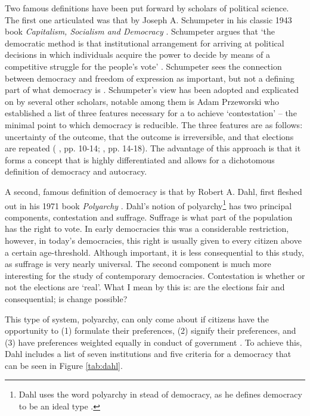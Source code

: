 Two famous definitions have been put forward by scholars of political science. The first one articulated was that by Joseph A. Schumpeter in his classic 1943 book \textit{Capitalism, Socialism and Democracy} \citeyearpar{schumpeter_capitalism_2010}.  Schumpeter argues that `the democratic method is that institutional arrangement for arriving at political decisions in which individuals acquire the power to decide by means of a competitive struggle for the people’s vote' \citep[p. 241]{schumpeter_capitalism_2010}. Schumpeter sees the connection between democracy and freedom of expression as important, but not a defining part of what democracy is \citep[pp. 243-244]{schumpeter_capitalism_2010}. Schumpeter's view has been adopted and explicated on by several other scholars, notable among them is Adam Przeworski who established a list of three features necessary for a to achieve `contestation' -- the minimal point to which democracy is reducible. The three features are as follows: uncertainty of the outcome, that the outcome is irreversible, and that elections are repeated (\citeauthor{przeworski_democracy_1991} \citeyear{przeworski_democracy_1991}, pp. 10-14; \citeauthor{przeworski_modernization_1997} \citeyear{przeworski_modernization_1997}, pp. 14-18). The advantage of this approach is that it forms a concept that is highly differentiated and allows for a dichotomous definition of democracy and autocracy. 

A second, famous definition of democracy is that by Robert A. Dahl, first fleshed out in his 1971 book \textit{Polyarchy} \citeyearpar{dahl_polyarchy_1971}. Dahl's notion of polyarchy\footnote{Dahl uses the word polyarchy in stead of democracy, as he defines democracy to be an ideal type \citep[p. 9]{dahl_polyarchy_1971}.} has two principal components, contestation and suffrage. Suffrage is what part of the population has the right to vote. In early democracies this was a considerable restriction, however, in today's democracies, this right is usually given to every citizen above a certain age-threshold. Although important, it is less consequential to this study, as suffrage is very nearly universal. The second component is much more interesting for the study of contemporary democracies. Contestation is whether or not the elections are `real'. What I mean by this is: are the elections fair and consequential; is change possible? 

This type of system, polyarchy, can only come about if citizens have the opportunity to (1) formulate their preferences, (2) signify their preferences, and (3) have preferences weighted equally in conduct of government \citep[pp. 2-3]{dahl_polyarchy_1971}. To achieve this, Dahl includes a list of seven institutions and five criteria for a democracy that can be seen in Figure \ref{tab:dahl}.

